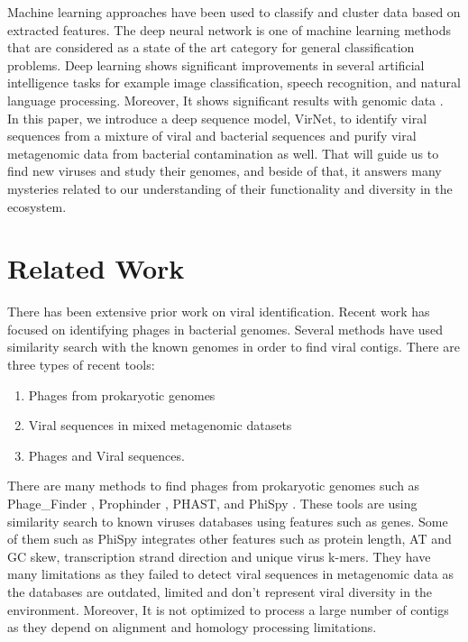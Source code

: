 \documentclass[conference]{IEEEtran}
\begin{document}
Machine learning approaches have been used to classify and cluster data based on extracted features. The deep neural network is one of machine learning methods that are considered as a state of the art category for general classification problems. Deep learning shows significant improvements in several artificial intelligence tasks for example image classification, speech recognition, and natural language processing. Moreover, It shows significant results with genomic data \cite{angermueller2016deep}. \\

In this paper, we introduce a deep sequence model, VirNet, to identify viral sequences from a mixture of viral and bacterial sequences and purify viral metagenomic data from bacterial contamination as well. That will guide us to find new viruses and study their genomes, and beside of that, it answers many mysteries related to our understanding of their functionality and diversity in the ecosystem.

\section{Related Work}

There has been extensive prior work on viral identification. Recent work has focused on identifying phages in bacterial genomes. Several methods have used similarity search with the known genomes in order to find viral contigs. There are three types of recent tools:
\begin{enumerate}
	\item Phages from prokaryotic genomes
	\item Viral sequences in mixed metagenomic datasets
	\item Phages and Viral sequences. 
\end{enumerate} 

There are many methods to find phages from prokaryotic genomes such as Phage\_Finder \cite{fouts2006phage_finder}, Prophinder \cite{lima2008prophinder}, PHAST\cite{zhou2011phast}, and PhiSpy \cite{akhter2012phispy}. These tools are using similarity search to known viruses databases using features such as genes. Some of them such as PhiSpy integrates other features such as protein length, AT and GC skew, transcription strand direction and unique virus k-mers. They have many limitations as they failed to detect viral sequences in metagenomic data as the databases are outdated, limited and don't represent viral diversity in the environment. Moreover, It is not optimized to process a large number of contigs \cite{roux2015virsorter} as they depend on alignment and homology processing limitations. 
\end{document}
